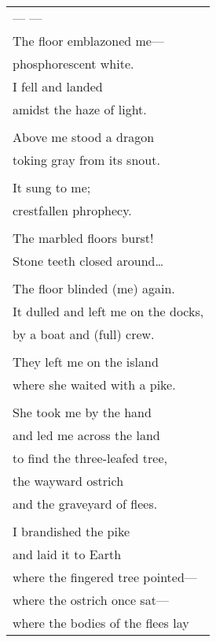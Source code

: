 \documentclass{article}
\begin{document}
\begin{tabular}{l}
\\
--- --- \\
The floor emblazoned me--- \\
phosphorescent white. \\
I fell and landed \\
amidst the haze of light. \\
\\
Above me stood a dragon \\
toking gray from its snout. \\
\\
It sung to me; \\
crestfallen phrophecy. \\
\\
The marbled floors burst! \\
Stone teeth closed around\ldots{} \\
\\
The floor blinded (me) again. \\
It dulled and left me on the docks, \\
by a boat and (full) crew. \\
\\
They left me on the island \\
where she waited with a pike. \\
\\
She took me by the hand \\
and led me across the land \\
to find the three-leafed tree, \\
the wayward ostrich \\
and the graveyard of flees. \\
\\
I brandished the pike \\
and laid it to Earth \\
where the fingered tree pointed--- \\
where the ostrich once sat--- \\
where the bodies of the flees lay \\

\end{tabular}
\end{document}
